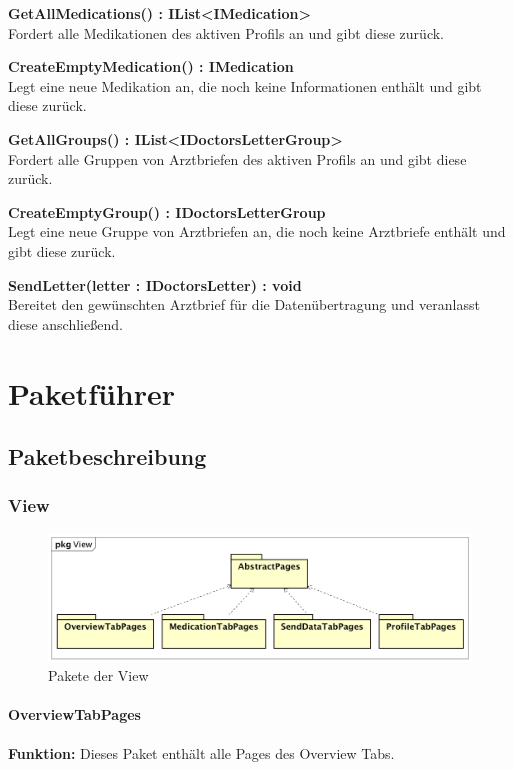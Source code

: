 \documentclass[a4paper]{scrreprt}
\begin{document}
\textbf{GetAllMedications() : IList<IMedication>}\\
Fordert alle Medikationen des aktiven Profils an und gibt diese zurück.

\textbf{CreateEmptyMedication() : IMedication}\\
Legt eine neue Medikation an, die noch keine Informationen enthält und gibt diese zurück.

\textbf{GetAllGroups() : IList<IDoctorsLetterGroup>}\\
Fordert alle Gruppen von Arztbriefen des aktiven Profils an und gibt diese zurück.

\textbf{CreateEmptyGroup() : IDoctorsLetterGroup}\\
Legt eine neue Gruppe von Arztbriefen an, die noch keine Arztbriefe enthält und gibt diese zurück.

\textbf{SendLetter(letter : IDoctorsLetter) : void}\\
Bereitet den gewünschten Arztbrief für die Datenübertragung und veranlasst diese anschließend.

\chapter{Paketführer}
\section{Paketbeschreibung}
\subsection{View}
\begin{figure}[H]
\centering
\includegraphics[width=0.75\textheight]{graphics/Klassendiagramme/View/ViewLayout.png}
\caption{Pakete der View}
\end{figure}
\subsubsection{OverviewTabPages}
\textbf{Funktion:} Dieses Paket enthält alle Pages des Overview Tabs.
\end{document}
